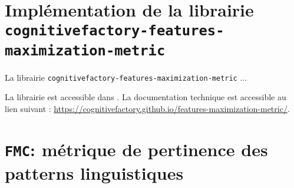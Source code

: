 \section{Implémentation de la librairie \texttt{cognitivefactory-features-maximization-metric}}
\label{section:C.2-DESCRIPTION-IMPLEMENTATION-FEATURES-MAXIMIZATION-METRIC}
	
	La librairie \texttt{cognitivefactory-features-maximization-metric} ...
	
	\begin{leftBarInformation}
		La librairie est accessible dans \cite{schild:2023:cognitivefactory-featuresmaximizationmetric}.
		La documentation technique est accessible au lien suivant : \url{https://cognitivefactory.github.io/features-maximization-metric/}.
	\end{leftBarInformation}

	\section{\texttt{FMC}: métrique de pertinence des patterns linguistiques}
	\label{annex:C.2.1-DESCRIPTION-IMPLEMENTATION-FEATURES-MAXIMIZATION-METRIC-THEORIE}
